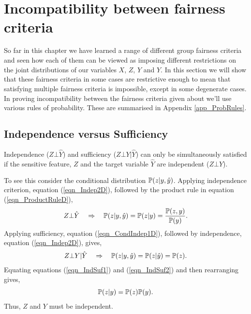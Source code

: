 \section{Incompatibility between fairness criteria}

So far in this chapter we have learned a range of different group fairness criteria and seen how each of them can be viewed as imposing different restrictions on the joint distributions of our variables $X$, $Z$, $Y$ and $\hat{Y}$. In this section we will show that these fairness criteria in some cases are restrictive enough to mean that satisfying multiple fairness criteria is impossible, except in some degenerate cases. In proving incompatibility between the fairness criteria given about we'll use various rules of probability. These are summarised in Appendix \ref{app_ProbRules}.

\subsection{Independence versus Sufficiency}

\begin{lookbox}
Independence ($Z \bot \hat{Y}$) and sufficiency ($Z \bot Y | \hat{Y}$) can only be simultaneously satisfied if the sensitive feature, $Z$ and the target variable $\hat{Y}$ are independent ($Z \bot Y$).
\end{lookbox}

To see this consider the conditional distribution $\mathbb{P}(z|y,\hat{y})$. Applying independence criterion, equation (\ref{eqn_Indep2D}), followed by the product rule in equation (\ref{eqn_ProductRuleD}),
\begin{equation} \label{eqn_IndSuf1}
Z \bot \hat{Y} \quad \Rightarrow \quad  \mathbb{P}(z|y,\hat{y})
= \mathbb{P}(z|y) = \frac{\mathbb{P}(z,y)}{\mathbb{P}(y)}.
\end{equation}
Applying sufficiency, equation (\ref{eqn_CondIndep1D}), followed by independence, equation (\ref{eqn_Indep2D}), gives,
\begin{equation} \label{eqn_IndSuf2}
Z \bot Y | \hat{Y} \quad \Rightarrow \quad  \mathbb{P}(z|y,\hat{y})
= \mathbb{P}(z|\hat{y}) = \mathbb{P}(z).
\end{equation}
Equating equations (\ref{eqn_IndSuf1}) and (\ref{eqn_IndSuf2}) and then rearranging gives,
\[
\mathbb{P}(z|y) = \mathbb{P}(z)\mathbb{P}(y).
\]
Thus, $Z$ and $Y$ must be independent.

